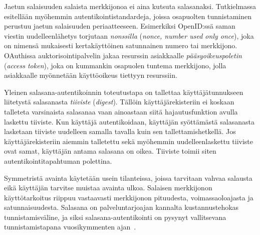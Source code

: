 \documentclass[finnish,gradu]{tktltiki}
\begin{document}
  Jaetun salaisuuden salaista merkkijonoa ei aina kutsuta salasanaksi. Tutkielmassa esitellään myöhemmin autentikointistandardeja, joissa osapuolten tunnistaminen perustuu jaetun salaisuuden periaatteeseen. Esimerkiksi OpenID:ssä saman viestin uudelleenlähetys torjutaan \emph{nonssilla} (\emph{nonce, number used only once}), joka on nimensä mukaisesti kertakäyttöinen satunnainen numero tai merkkijono. OAuthissa auktorisointipalvelin jakaa resurssin asiakkaalle \emph{pääsyoikeuspoletin} (\emph{access token}), joka on kummankin osapuolen tuntema merkkijono, jolla asiakkaalle myönnetään käyttöoikeus tiettyyn resurssiin.

  Yleinen salasana-autentikoinnin toteutustapa on tallettaa käyttäjätunnukseen liitetystä salasanasta \emph{tiiviste} (\emph{digest}). Tällöin käyttäjärekisteriin ei koskaan talleteta varsinaista salasanaa vaan ainoastaan siitä hajautusfunktion avulla laskettu tiiviste. Kun käyttäjä autentikoidaan, käyttäjän syöttämästä salasanasta lasketaan tiiviste uudelleen samalla tavalla kuin sen tallettamishetkellä. Jos käyttäjärekisteriin aiemmin talletettu sekä myöhemmin uudelleenlaskettu tiiviste ovat samat, käyttäjän antama salasana on oikea. Tiiviste toimii siten autentikointitapahtuman polettina.

  Symmetristä avainta käytetään usein tilanteissa, joissa tarvitaan vahvaa salausta eikä käyttäjän tarvitse muistaa avainta ulkoa. Salaisen merkkijonon käyttötarkoitus riippuu vastaavasti merkkijonon pituudesta, voimassaoloajasta ja satunnaisuudesta. Salasana on palveluntarjoajan kannalta kustannustehokas tunnistamisväline, ja siksi salasana-autentikointi on pysynyt vallitsevana tunnistamistapana vuosikymmenten ajan~\cite{pw_auth_system_perspective_08}.



\end{document}
